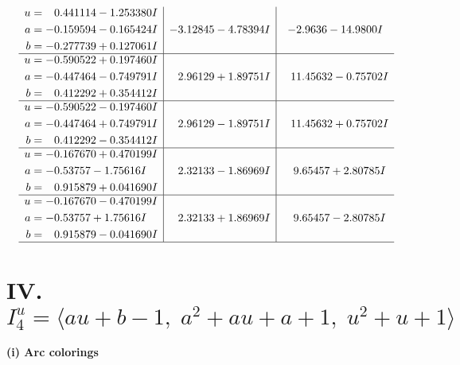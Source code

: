 \documentclass[1p]{elsarticle_modified}
\theoremstyle{definition}
\begin{document}
$$\begin{array}{c|c|c}
\begin{aligned}
u &= \phantom{-}0.441114 - 1.253380 I \\
a &= -0.159594 - 0.165424 I \\
b &= -0.277739 + 0.127061 I\end{aligned}
 & -3.12845 - 4.78394 I & -2.9636 - 14.9800 I \\ \hline\begin{aligned}
u &= -0.590522 + 0.197460 I \\
a &= -0.447464 - 0.749791 I \\
b &= \phantom{-}0.412292 + 0.354412 I\end{aligned}
 & \phantom{-}2.96129 + 1.89751 I & \phantom{-}11.45632 - 0.75702 I \\ \hline\begin{aligned}
u &= -0.590522 - 0.197460 I \\
a &= -0.447464 + 0.749791 I \\
b &= \phantom{-}0.412292 - 0.354412 I\end{aligned}
 & \phantom{-}2.96129 - 1.89751 I & \phantom{-}11.45632 + 0.75702 I \\ \hline\begin{aligned}
u &= -0.167670 + 0.470199 I \\
a &= -0.53757 - 1.75616 I \\
b &= \phantom{-}0.915879 + 0.041690 I\end{aligned}
 & \phantom{-}2.32133 - 1.86969 I & \phantom{-}9.65457 + 2.80785 I \\ \hline\begin{aligned}
u &= -0.167670 - 0.470199 I \\
a &= -0.53757 + 1.75616 I \\
b &= \phantom{-}0.915879 - 0.041690 I\end{aligned}
 & \phantom{-}2.32133 + 1.86969 I & \phantom{-}9.65457 - 2.80785 I\\
 \hline 
 \end{array}$$\newpage\newpage\renewcommand{\arraystretch}{1}
\centering \section*{IV. $I^u_{4}= \langle a u+b-1,\;a^2+a u+a+1,\;u^2+u+1 \rangle$}
\flushleft \textbf{(i) Arc colorings}\\
\end{document}
